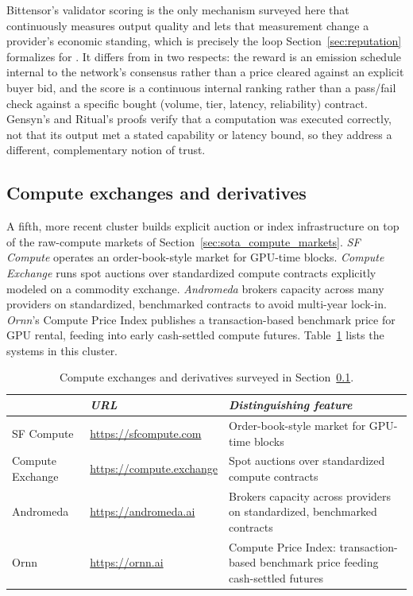 Bittensor's validator scoring is the only mechanism surveyed here that
continuously measures output quality and lets that measurement change a
provider's economic standing, which is precisely the loop
Section~\ref{sec:reputation} formalizes for \NoesisMarket. It differs from
\Noesis{} in two respects: the reward is an emission schedule internal to
the network's consensus rather than a price cleared against an explicit
buyer bid, and the score is a continuous internal ranking rather than a
pass/fail check against a specific bought (volume, tier, latency,
reliability) contract. Gensyn's and Ritual's proofs verify that a
computation was executed correctly, not that its output met a stated
capability or latency bound, so they address a different, complementary
notion of trust.

\subsection{Compute exchanges and derivatives}
\label{sec:sota_exchanges}

A fifth, more recent cluster builds explicit auction or index
infrastructure on top of the raw-compute markets of
Section~\ref{sec:sota_compute_markets}. \emph{SF Compute} operates an
order-book-style market for GPU-time blocks. \emph{Compute Exchange} runs
spot auctions over standardized compute contracts explicitly modeled on a
commodity exchange. \emph{Andromeda} brokers capacity across many
providers on standardized, benchmarked contracts to avoid multi-year
lock-in. \emph{Ornn}'s Compute Price Index publishes a transaction-based
benchmark price for GPU rental, feeding into early cash-settled compute
futures.
Table~\ref{tab:sota_exchanges_companies} lists the systems in this cluster.

\begin{samepage}
  \begin{table}[H]
    \centering
    \footnotesize
    \begin{tabular}{l|l|p{5.8cm}|}
                        & \emph{URL} & \emph{Distinguishing feature} \\
      \hline
      SF Compute         & \url{https://sfcompute.com} & Order-book-style market for GPU-time blocks \\
      \hline
      Compute Exchange   & \url{https://compute.exchange} & Spot auctions over standardized compute contracts \\
      \hline
      Andromeda          & \url{https://andromeda.ai} & Brokers capacity across providers on standardized, benchmarked contracts \\
      \hline
      Ornn               & \url{https://ornn.ai} & Compute Price Index: transaction-based benchmark price feeding cash-settled futures \\
      \hline
    \end{tabular}
    \caption{Compute exchanges and derivatives surveyed in
      Section~\ref{sec:sota_exchanges}.}
    \label{tab:sota_exchanges_companies}
  \end{table}
\end{samepage}

